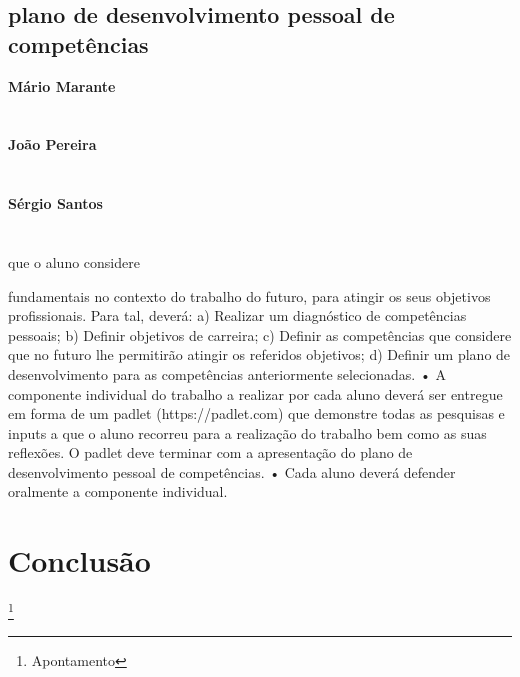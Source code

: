 \subsection{plano de desenvolvimento pessoal de competências}
\textbf{Mário Marante}\\
\\ \\
\textbf{João Pereira}\\
\\ \\
\textbf{Sérgio Santos}\\
\\ \\



que o aluno considere

fundamentais no contexto do trabalho do futuro, para atingir os seus objetivos
profissionais. Para tal, deverá:
a) Realizar um diagnóstico de competências pessoais;
b) Definir objetivos de carreira;
c) Definir as competências que considere que no futuro lhe permitirão atingir os
referidos objetivos;
d) Definir um plano de desenvolvimento para as competências anteriormente
selecionadas.
• A componente individual do trabalho a realizar por cada aluno deverá ser entregue em forma de um padlet (https://padlet.com) que demonstre todas as pesquisas e inputs a que o aluno recorreu para a realização do trabalho bem como as suas reflexões. O padlet deve terminar com a apresentação do plano de
desenvolvimento pessoal de competências.
• Cada aluno deverá defender oralmente a componente individual.


\newpage
\section{Conclusão}
\newpage
%
%
\listoffigures
\cite{*}

\newpage
\footnote{Apontamento}

